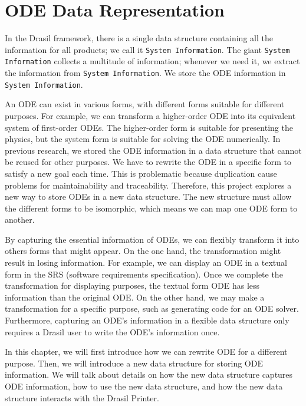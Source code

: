 \chapter{ODE Data Representation}
In the Drasil framework, there is a single data structure containing all the information for all products; we call it \verb|System Information|. The giant \verb|System Information| collects a multitude of information; whenever we need it, we extract the information from \verb|System Information|. We store the ODE information in \verb|System Information|. 

An ODE can exist in various forms, with different forms suitable for different purposes. For example, we can transform a higher-order ODE into its equivalent system of first-order ODEs. The higher-order form is suitable for presenting the physics, but the system form is suitable for solving the ODE numerically. In previous research, we stored the ODE information in a data structure that cannot be reused for other purposes. We have to rewrite the ODE in a specific form to satisfy a new goal each time. This is problematic because duplication cause problems for maintainability and traceability. Therefore, this project explores a new way to store ODEs in a new data structure. The new structure must allow the different forms to be isomorphic, which means we can map one ODE form to another.

By capturing the essential information of ODEs, we can flexibly transform it into others forms that might appear. On the one hand, the transformation might result in losing information. For example, we can display an ODE in a textual form in the SRS (software requirements specification). Once we complete the transformation for displaying purposes, the textual form ODE has less information than the original ODE. On the other hand, we may make a transformation for a specific purpose, such as generating code for an ODE solver. Furthermore, capturing an ODE's information in a flexible data structure only requires a Drasil user to write the ODE's information once.

In this chapter, we will first introduce how we can rewrite ODE for a different purpose. Then, we will introduce a new data structure for storing ODE information. We will talk about details on how the new data structure captures ODE information, how to use the new data structure, and how the new data structure interacts with the Drasil Printer.

